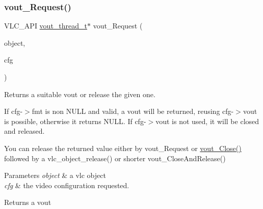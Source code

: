 \subsubsection{\texorpdfstring{vout\+\_\+\+Request()}{vout\_Request()}}
{\footnotesize\ttfamily V\+L\+C\+\_\+\+A\+PI \hyperlink{structvout__thread__t}{vout\+\_\+thread\+\_\+t}$\ast$ vout\+\_\+\+Request (\begin{DoxyParamCaption}\item[{\hyperlink{structvlc__object__t}{vlc\+\_\+object\+\_\+t} $\ast$}]{object,  }\item[{const \hyperlink{structvout__configuration__t}{vout\+\_\+configuration\+\_\+t} $\ast$}]{cfg }\end{DoxyParamCaption})}

Returns a suitable vout or release the given one.

If cfg-\/$>$fmt is non N\+U\+LL and valid, a vout will be returned, reusing cfg-\/$>$vout is possible, otherwise it returns N\+U\+LL. If cfg-\/$>$vout is not used, it will be closed and released.

You can release the returned value either by vout\+\_\+\+Request or \hyperlink{group__video__output_gac4265e793646e4730afe6ce9495205ae}{vout\+\_\+\+Close()} followed by a vlc\+\_\+object\+\_\+release() or shorter vout\+\_\+\+Close\+And\+Release()


\begin{DoxyParams}{Parameters}
{\em object} & a vlc object \\
\hline
{\em cfg} & the video configuration requested. \\
\hline
\end{DoxyParams}
\begin{DoxyReturn}{Returns}
a vout 
\end{DoxyReturn}
